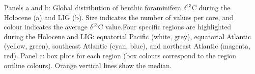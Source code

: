 Panels a and b: Global distribution of benthic foraminifera $\delta^{13}$C during the Holocene (a) and LIG (b). Size indicates the number of values per core, and colour indicates the average $\delta^{13}$C value.Four specific regions are highlighted during the Holocene and LIG: equatorial Pacific (white, grey), equatorial Atlantic (yellow, green), southeast Atlantic (cyan, blue), and northeast Atlantic (magenta, red). Panel c: box plots for each region (box colours correspond to the region outline colours). Orange vertical lines show the median.